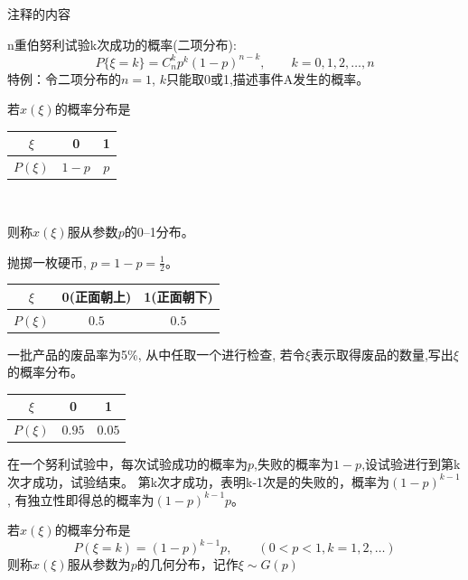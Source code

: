 
注释的内容
\iffalse　　%

\begin{frame}
n重伯努利试验k次成功的概率(二项分布):
\[P\{\xi=k\}=C_{n}^{k}p^{k}(1-p)^{n-k},\qquad k=0,1,2,\dots,n\]
特例：令二项分布的$n=1$, $k$只能取0或1,描述事件A发生的概率。

\begin{definition}[0--1分布]
	若$x(\xi)$的概率分布是\\
	\begin{center}
	\begin{tabular}{|c|c|c|}
		\hline 
		$\xi$ & 0 & 1\\ 
		\hline 
		$P(\xi)$ & $1-p$ & $p$\\ 
		\hline 
	\end{tabular} \\
	\end{center}
	则称$x(\xi)$服从参数$p$的0--1分布。
\end{definition}

\end{frame}

\begin{frame}
\begin{example}
	抛掷一枚硬币, $p=1-p=\frac{1}{2}$。\\
	\begin{tabular}{|c|c|c|}
		\hline 
		$\xi$ & 0(正面朝上) & 1(正面朝下)\\ 
		\hline 
		$P(\xi)$ & $0.5$ & $0.5$\\ 
		\hline 
	\end{tabular} 
\end{example}

\begin{example}
	一批产品的废品率为5\%, 从中任取一个进行检查, 若令$\xi$表示取得废品的数量,写出$\xi$的概率分布。\\
	\begin{tabular}{|c|c|c|}
		\hline 
		$\xi$ & 0 & 1\\ 
		\hline 
		$P(\xi)$ & $0.95$ & $0.05$\\ 
		\hline 
	\end{tabular} 
\end{example}
\end{frame}

\begin{frame}
在一个努利试验中，每次试验成功的概率为$p$,失败的概率为$1-p$,设试验进行到第k次才成功，试验结束。
第k次才成功，表明k-1次是的失败的，概率为$(1-p)^{k-1}$, 有独立性即得总的概率为$(1-p)^{k-1}p$。

\begin{definition}[几何分布]
	若$x(\xi)$的概率分布是
	\[P(\xi=k)=(1-p)^{k-1}p,\qquad (0<p<1,k=1,2,\dots)\]
	则称$x(\xi)$服从参数为$p$的几何分布，记作$\xi\sim G(p)$
\end{definition}
\end{frame}

